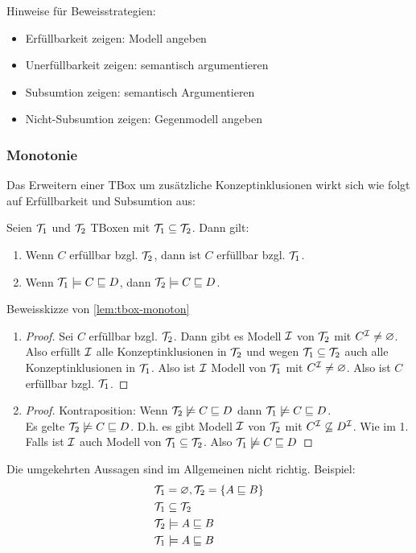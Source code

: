 Hinweise für Beweisstrategien:
\begin{itemize}
\item Erfüllbarkeit zeigen: Modell angeben
\item Unerfüllbarkeit zeigen: semantisch argumentieren
\item Subsumtion zeigen: semantisch Argumentieren
\item Nicht-Subsumtion zeigen: Gegenmodell angeben
\end{itemize}

\subsubsection{Monotonie}\label{monotonie}
Das Erweitern einer TBox um zusätzliche Konzeptinklusionen wirkt sich wie folgt auf Erfüllbarkeit und Subsumtion aus:

\begin{lemma}
\label{lem:tbox-monoton}
Seien $\mathcal{T}_1$ und $\mathcal{T}_2$ TBoxen mit $\mathcal{T}_1 \subseteq \mathcal{T}_2$. Dann gilt:
\begin{enumerate}
\item
  Wenn $C$ erfüllbar bzgl. $\mathcal{T}_2$, dann ist $C$ erfüllbar bzgl.
  $\mathcal{T}_1$.
\item
  Wenn $\mathcal{T}_1 \models C \sqsubseteq D$, dann
  $\mathcal{T}_2 \models C \sqsubseteq D$.
\end{enumerate}
\end{lemma}

\begin{tafel}Beweisskizze von \autoref{lem:tbox-monoton}
\begin{enumerate}
  \item \begin{proof}
      Sei $C$ erfüllbar bzgl. $\mathcal{T}_2$.
  Dann gibt es Modell $\mathcal{I}$ von $\mathcal{T}_2$ mit $C^{\mathcal{I}} \neq \varnothing$.
  Also erfüllt $\mathcal{I}$ alle Konzeptinklusionen in $\mathcal{T}_2$ und wegen $\mathcal{T}_1 \subseteq \mathcal{T}_2$ auch alle Konzeptinklusionen in $\mathcal{T}_1$.
  Also ist $\mathcal{I}$ Modell von $\mathcal{T}_1$ mit $C^{\mathcal{I}} \neq \varnothing$.
  Also ist $C$ erfüllbar bzgl. $\mathcal{T}_1$.
  \end{proof}
  \item \begin{proof}
    Kontraposition: Wenn $\mathcal{T}_2 \not\models C \sqsubseteq D$ dann $\mathcal{T}_1 \not\models C \sqsubseteq D$. \\
  Es gelte $\mathcal{T}_2 \not\models C \sqsubseteq D$.
  D.h. es gibt Modell $\mathcal{I}$ von $\mathcal{T}_2$ mit $C^{\mathcal{I}} \not\subseteq D^{\mathcal{I}}$.
  Wie im 1. Falls ist $\mathcal{I}$ auch Modell von $\mathcal{T}_1 \subseteq \mathcal{T}_2$.
  Also $\mathcal{T}_1 \not\models C \sqsubseteq D$
  \end{proof}
\end{enumerate}

Die umgekehrten Aussagen sind im Allgemeinen nicht richtig. Beispiel:
\begin{align*}
    &\mathcal{T}_1 = \varnothing, \mathcal{T}_2 = \{A \sqsubseteq B\}\\
    &\mathcal{T}_1 \subseteq \mathcal{T}_2 \\
    &\mathcal{T}_2 \models A \sqsubseteq B\\
    &\mathcal{T}_1 \models A \sqsubseteq B
\end{align*}
\end{tafel}

